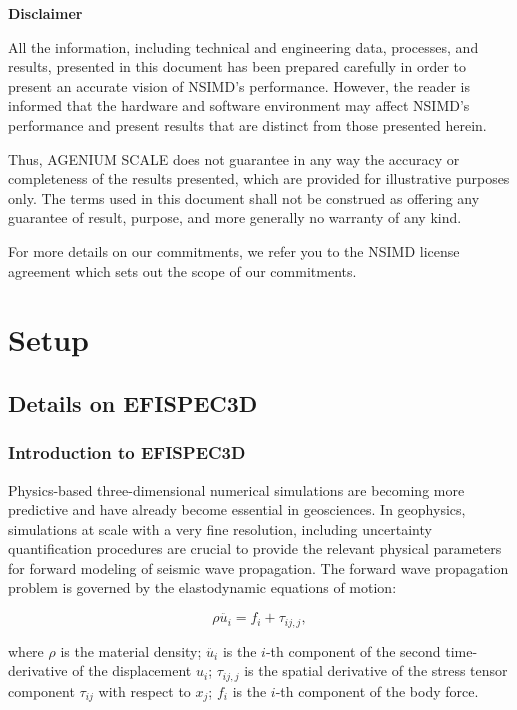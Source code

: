\documentclass[a4paper,11pt]{article}
\newcommand{\efispec}{EFISPEC3D}
\newcommand{\ageniumscale}{AGENIUM SCALE}
\begin{document}
\begin{mdframed}{
  \textbf{Disclaimer}

  All the information, including technical and engineering data, processes,
  and results, presented in this document has been prepared carefully in
  order to present an accurate vision of NSIMD's performance. However, the
  reader is informed that the hardware and software environment may affect
  NSIMD's performance and present results that are distinct from those
  presented herein.

  Thus, \ageniumscale{} does not guarantee in any way the accuracy or
  completeness of the results presented, which are provided for illustrative
  purposes only. The terms used in this document shall not be construed as
  offering any guarantee of result, purpose, and more generally no warranty of
  any kind.

  For more details on our commitments, we refer you to the NSIMD license
  agreement which sets out the scope of our commitments.
}\end{mdframed}

\section{Setup}%
\label{sec:setup}

\subsection{Details on \efispec{}}

\subsubsection{Introduction to \efispec{}}

Physics-based three-dimensional numerical simulations are becoming more
predictive and have already become essential in geosciences. In geophysics,
simulations at scale with a very fine resolution, including uncertainty
quantification procedures are crucial to provide the relevant physical
parameters for forward modeling of seismic wave propagation. The forward wave
propagation problem is governed by the elastodynamic equations of motion:

\begin{equation}
\label{equ:eom}
  \rho \ddot{u_{i}} = f_{i} + \tau_{ij,j},
\end{equation}

\noindent where $\rho$ is the material density; $\ddot{u_{i}}$ is the $i$-th
component of the second time-derivative of the displacement $u_{i}$;
$\tau_{ij,j}$ is the spatial derivative of the stress tensor component
$\tau_{ij}$ with respect to $x_j$; $ f_{i}$ is the $i$-th component of the body
force.
\end{document}
